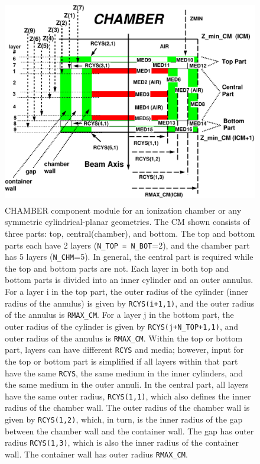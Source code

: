 \documentclass[12pt,twoside]{article}
\begin{document}
\begin{figure}[h]
\begin{center}
\leavevmode
\mbox{}\hspace{0cm}
\includegraphics[height=9.0cm]{figures/chamberd}
\end{center}
\caption[CHAMBER CM geometry]
{CHAMBER component module for an ionization chamber or any symmetric
cylindrical-planar geometries. The CM shown consists of three parts: top,
central(chamber), and bottom.  The top and bottom parts each have 2
layers ({\tt N\_TOP = N\_BOT}=2),
and the chamber part has 5 layers ({\tt N\_CHM}=5).  In
general, the central part is required while the
top and bottom parts are not.  Each layer in both top and bottom parts
is divided into an inner cylinder and an outer annulus.  For a
layer i in the top part, the outer
radius of the cylinder (inner radius of the annulus) is given by
{\tt RCYS(i+1,1)}, and the outer radius of the annulus is {\tt RMAX\_CM}.
For a
layer j in the bottom part, the outer radius of the cylinder is
given by {\tt RCYS(j+N\_TOP+1,1)}, and outer radius of the annulus is
{\tt RMAX\_CM}.
Within the top or bottom part, layers can have different {\tt RCYS} and media;
however, input for the top or bottom part is simplified if all layers
within that
part have the same {\tt RCYS}, the same medium in the inner cylinders, and
the same medium in the outer annuli.  In the central part, all layers
have the same outer radius, {\tt RCYS(1,1)}, which also defines the inner
radius of the chamber wall.  The outer radius of the chamber wall is
given by {\tt RCYS(1,2)}, which, in turn, is the inner radius of the gap
between the chamber wall and the container wall.  The gap has outer
radius {\tt RCYS(1,3)}, which is also the inner radius of the container wall.
The container wall has outer radius {\tt RMAX\_CM}.}
\label{fig_CHAMBERD}
\end{figure}
\clearpage
\end{document}
